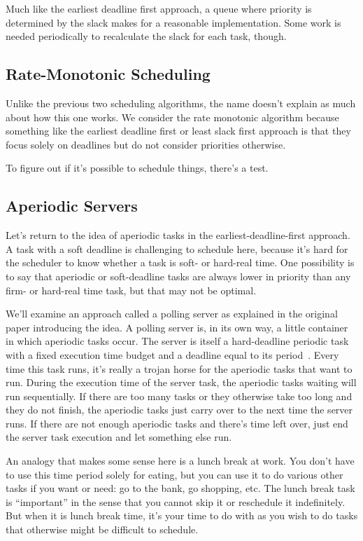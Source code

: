Much like the earliest deadline first approach, a queue where priority is determined by the slack makes for a reasonable implementation. Some work is needed periodically to recalculate the slack for each task, though. 

\subsection*{Rate-Monotonic Scheduling}

Unlike the previous two scheduling algorithms, the name doesn't explain as much about how this one works. We consider the rate monotonic algorithm because something like the earliest deadline first or least slack first approach is that they focus solely on deadlines but do not consider priorities otherwise. 


To figure out if it's possible to schedule things, there's a test.

\subsection*{Aperiodic Servers}
Let's return to the idea of aperiodic tasks in the earliest-deadline-first approach. A task with a soft deadline is challenging to schedule here, because it's hard for the scheduler to know whether a task is soft- or hard-real time. One possibility is to say that aperiodic or soft-deadline tasks are always lower in priority than any firm- or hard-real time task, but that may not be optimal. 

We'll examine an approach called a polling server as explained in the original paper introducing the idea. A polling server is, in its own way, a little container in which aperiodic tasks occur. The server is itself a hard-deadline periodic task with a fixed execution time budget and a deadline equal to its period~\cite{aperiodic-server}. Every time this task runs, it's really a trojan horse for the aperiodic tasks that want to run. During the execution time of the server task, the aperiodic tasks waiting will run sequentially. If there are too many tasks or they otherwise take too long and they do not finish, the aperiodic tasks just carry over to the next time the server runs. If there are not enough aperiodic tasks and there's time left over, just end the server task execution and let something else run.

An analogy that makes some sense here is a lunch break at work. You don't have to use this time period solely for eating, but you can use it to do various other tasks if you want or need: go to the bank, go shopping, etc. The lunch break task is ``important'' in the sense that you cannot skip it or reschedule it indefinitely. But when it is lunch break time, it's your time to do with as you wish to do tasks that otherwise might be difficult to schedule.



